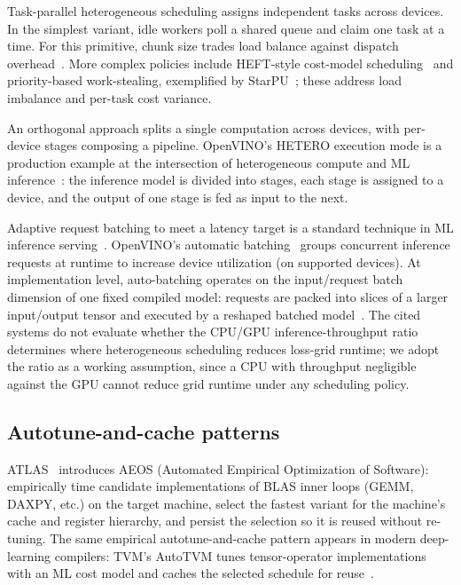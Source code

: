 Task-parallel heterogeneous scheduling assigns
independent tasks across devices. In the simplest variant,
idle workers poll a shared queue and claim one task at a
time. For this primitive, chunk size trades load balance
against dispatch
overhead~\cite{kruskal1985selfscheduling}. More complex policies
include HEFT-style cost-model
scheduling~\cite{topcuoglu2002heft} and priority-based
work-stealing, exemplified by
StarPU~\cite{augonnet2011starpu}; these address load
imbalance and per-task cost variance.

An orthogonal approach splits a single computation across
devices, with per-device stages composing a pipeline. OpenVINO's HETERO execution mode is a
production example at the intersection of heterogeneous
compute and ML inference~\cite{openvino_hetero}: the
inference model is divided into stages, each stage is assigned
to a device, and the output of one stage is fed as input to
the next.

Adaptive request batching to meet a latency target is a
standard technique in ML inference
serving~\cite{crankshaw2017clipper}. OpenVINO's automatic
batching~\cite{openvino_auto_batching}
groups concurrent inference requests at runtime to
increase device utilization (on supported devices). At implementation level,
auto-batching operates on the input/request batch dimension
of one fixed compiled model: requests are packed into slices
of a larger input/output tensor and executed by a reshaped
batched model~\cite{openvino_auto_batching_src}. The cited
systems do not evaluate whether the CPU/GPU
inference-throughput ratio determines where heterogeneous
scheduling reduces loss-grid runtime; we adopt the ratio as a
working assumption, since a CPU with throughput negligible
against the GPU cannot reduce grid runtime under any
scheduling policy.

\subsection{Autotune-and-cache patterns}\label{rw-autotuning}

ATLAS~\cite{whaley1998atlas} introduces AEOS (Automated
Empirical Optimization of Software): empirically time
candidate implementations of BLAS inner loops (GEMM, DAXPY,
etc.) on the target machine, select the fastest variant for
the machine's cache and register hierarchy, and persist the
selection so it is reused without re-tuning. The same
empirical autotune-and-cache pattern appears in modern
deep-learning compilers: TVM's AutoTVM tunes tensor-operator
implementations with an ML cost model and caches the selected
schedule for reuse~\cite{chen2018tvm}.

